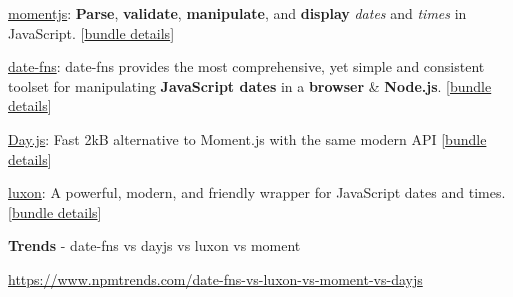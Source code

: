 \documentclass[10pt]{article}
\begin{document}
\begin{thebibliography}{9}
\href{https://momentjs.com/}{momentjs}: \textbf{Parse}, \textbf{validate}, \textbf{manipulate}, and \textbf{display} \emph{dates} and \emph{times} in JavaScript. [\href{https://bundlephobia.com/package/moment}{bundle details}]
	
\href{https://date-fns.org/}{date-fns}: date-fns provides the most comprehensive, yet simple and consistent toolset for manipulating \textbf{JavaScript dates} in a \textbf{browser} \& \textbf{Node.js}. [\href{https://bundlephobia.com/package/date-fns}{bundle details}]

\href{https://day.js.org/}{Day.js}: Fast 2kB alternative to Moment.js with the same modern API [\href{https://bundlephobia.com/package/dayjs}{bundle details}]

\href{https://moment.github.io/luxon/#/}{luxon}: A powerful, modern, and friendly wrapper for JavaScript dates and times. [\href{https://bundlephobia.com/package/luxon}{bundle details}]

\end{thebibliography}

\textbf{Trends} - date-fns vs dayjs vs luxon vs moment

\url{https://www.npmtrends.com/date-fns-vs-luxon-vs-moment-vs-dayjs}
\end{document}
